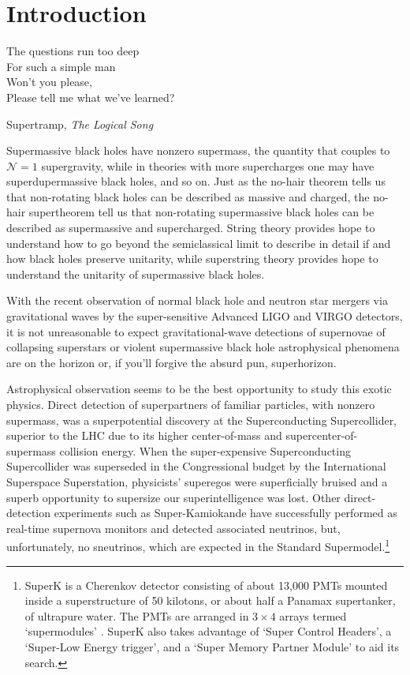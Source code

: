 \section{Introduction}

\epigraph{The questions run too deep\\
For such a simple man\\
Won't you please, \\
Please tell me what we've learned?}{Supertramp, \textit{The Logical Song}}

Supermassive black holes have nonzero supermass, the quantity that couples to $\mathcal{N}=1$ supergravity, while in theories with more supercharges one may have superdupermassive black holes, and so on.
Just as the no-hair theorem tells us that non-rotating black holes can be described as massive and charged, the no-hair supertheorem tell us that non-rotating supermassive black holes can be described as supermassive and supercharged.
String theory provides hope to understand how to go beyond the semiclassical limit to describe in detail if and how black holes preserve unitarity, while superstring theory provides hope to understand the unitarity of supermassive black holes.

With the recent observation of normal black hole \cite{Abbott:2016blz,Abbott:2016nmj,Abbott:2017vtc,Abbott:2017oio,Abbott:2017gyy} and neutron star\cite{TheLIGOScientific:2017qsa} mergers via gravitational waves by the super-sensitive Advanced LIGO and VIRGO detectors, it is not unreasonable to expect gravitational-wave detections of supernovae of collapsing superstars or violent supermassive black hole astrophysical phenomena are on the horizon or, if you'll forgive the absurd pun, superhorizon.

Astrophysical observation seems to be the best opportunity to study this exotic physics.
Direct detection of superpartners of familiar particles, with nonzero supermass, was a superpotential discovery at the Superconducting Supercollider, superior to the LHC due to its higher center-of-mass and supercenter-of-supermass collision energy.
When the super-expensive Superconducting Supercollider was superseded in the Congressional budget by the International Superspace Superstation, physicists' superegos were superficially bruised and a superb opportunity to supersize our superintelligence was lost.
Other direct-detection experiments such as Super-Kamiokande have successfully performed as real-time supernova monitors and detected associated neutrinos, but, unfortunately, no sneutrinos, which are expected in the Standard Supermodel.\footnote{ 
SuperK is a Cherenkov detector consisting of about 13,000 PMTs mounted inside a superstructure of 50 kilotons, or about half a Panamax supertanker, of ultrapure water.  The PMTs are arranged in $3\times4$ arrays termed `supermodules' \cite{Fukuda:2002uc}.
SuperK also takes advantage of `Super Control Headers', a `Super-Low Energy trigger', and a `Super Memory Partner Module' to aid its search.
}

